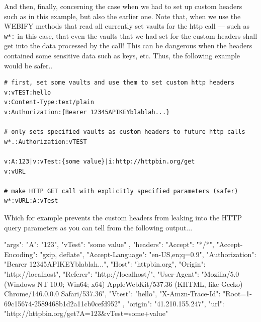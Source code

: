 \documentclass[a4paper, 18pt]{book} %
\begin{document}
{{{\vspace{2em}

And then, finally, concerning the case when we had to set up custom headers such as in this example, but also the earlier one. Note that, when we use the WEBIFY methods that read all currently set vaults for the http call --- such as \texttt{w*:} in this case, that even the vaults that we had set for the custom headers shall get into the data processed by the call! This can be dangerous when the headers contained some sensitive data such as keys, etc. Thus, the following example would be safer..



  \vspace{2em}

  \begin{tcolorbox}[teaterminalstyle, title=W: EXAMPLE 13: A Simple HTTP GET -  with Custom HTTP Headers, breakable]
  \begin{lstlisting}[language=TEA,breaklines=true,]
# first, set some vaults and use them to set custom http headers
v:vTEST:hello
v:Content-Type:text/plain
v:Authorization:{Bearer 12345APIKEYblablah...}

# only sets specified vaults as custom headers to future http calls
w*.:Authorization:vTEST 

v:A:123|v:vTest:{some value}|i:http://httpbin.org/get
v:vURL

# make HTTP GET call with explicitly specified parameters (safer)
w*:vURL:A:vTest
   \end{lstlisting}
  \end{tcolorbox}

\vspace{1em}

Which for example prevents the custom headers from leaking into the HTTP query parameters as you can tell from the following output...



 \vspace{2em}
 \begin{tcbverbatim}[title=Sample OUTPUT 13 from EXAMPLE 13]
{
  "args": {
    "A": "123", 
    "vTest": "some value"
  }, 
  "headers": {
    "Accept": "*/*", 
    "Accept-Encoding": "gzip, deflate", 
    "Accept-Language": "en-US,en;q=0.9", 
    "Authorization": "Bearer 12345APIKEYblablah...", 
    "Host": "httpbin.org", 
    "Origin": "http://localhost", 
    "Referer": "http://localhost/", 
    "User-Agent": "Mozilla/5.0 (Windows NT 10.0; Win64; x64) AppleWebKit/537.36 (KHTML, like Gecko) Chrome/146.0.0.0 Safari/537.36", 
    "Vtest": "hello", 
    "X-Amzn-Trace-Id": "Root=1-69c15674-2589468b1d2a11cb0cefd952"
  }, 
  "origin": "41.210.155.247", 
  "url": "http://httpbin.org/get?A=123&vTest=some+value"
}
  \end{tcbverbatim}
 \vspace{2em} 
 


}}}
\end{document}
